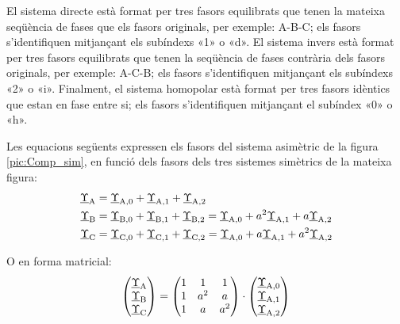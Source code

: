 \begin{center}
    
    \label{pic:Comp_sim}
\end{center}

 
 El sistema directe està format per tres
fasors equilibrats que tenen la mateixa seqüència de fases que els fasors
originals, per exemple: A-B-C; els fasors
s'identifiquen mitjançant els subíndexs «1» o «d». El sistema
invers està format per tres fasors equilibrats que tenen la seqüència de fases contrària
 dels fasors originals, per exemple: A-C-B; els fasors s'identifiquen mitjançant els
subíndexs «2» o «i». Finalment, el sistema homopolar està
format per tres fasors idèntics que estan en fase entre si; els fasors 
s'identifiquen mitjançant el subíndex «0» o «h».

Les equacions següents expressen els fasors del sistema asimètric de la figura \vref{pic:Comp_sim}, en funció
dels fasors dels tres sistemes simètrics de la mateixa figura:
\begin{subequations}
\begin{align}
   \underline{\Upsilon}_\mathrm{A} &= \underline{\Upsilon}_\mathrm{A,0}  +
   \underline{\Upsilon}_\mathrm{A,1} + \underline{\Upsilon}_\mathrm{A,2} \label{eq:c_sim_a}\\
   \underline{\Upsilon}_\mathrm{B} &= \underline{\Upsilon}_\mathrm{B,0} + \underline{\Upsilon}_\mathrm{B,1} +
   \underline{\Upsilon}_\mathrm{B,2}  =  \underline{\Upsilon}_\mathrm{A,0} + a^2
   \underline{\Upsilon}_\mathrm{A,1} + a \underline{\Upsilon}_\mathrm{A,2} \label{eq:c_sim_b}\\
   \underline{\Upsilon}_\mathrm{C} &= \underline{\Upsilon}_\mathrm{C,0} + \underline{\Upsilon}_\mathrm{C,1} +
   \underline{\Upsilon}_\mathrm{C,2}  = \underline{\Upsilon}_\mathrm{A,0} + a
   \underline{\Upsilon}_\mathrm{A,1} + a^2 \underline{\Upsilon}_\mathrm{A,2} \label{eq:c_sim_c}
\end{align}
\end{subequations}

O en forma matricial:
\begin{equation}\label{eq:c_sim_mat}
   \begin{pmatrix}
     \underline{\Upsilon}_\mathrm{A} \\
     \underline{\Upsilon}_\mathrm{B} \\
     \underline{\Upsilon}_\mathrm{C}
   \end{pmatrix} =
   \begin{pmatrix}
     1 & 1 & 1 \\
     1 & a^2 & a\\
     1 & a & a^2
   \end{pmatrix} \cdot
   \begin{pmatrix}
     \underline{\Upsilon}_\mathrm{A,0} \\
     \underline{\Upsilon}_\mathrm{A,1} \\
     \underline{\Upsilon}_\mathrm{A,2}
   \end{pmatrix}
\end{equation}

